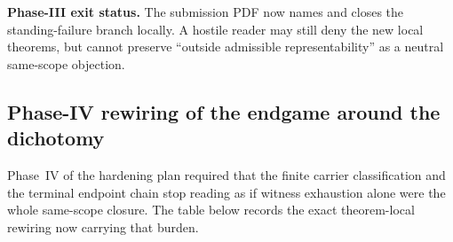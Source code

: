 \noindent\textbf{Phase-III exit status.} The submission PDF now names and closes the standing-failure branch locally. A hostile reader may still deny the new local theorems, but cannot preserve ``outside admissible representability'' as a neutral same-scope objection.

\subsection*{Phase-IV rewiring of the endgame around the dichotomy}
Phase~IV of the hardening plan required that the finite carrier classification and the terminal endpoint chain stop reading as if witness exhaustion alone were the whole same-scope closure. The table below records the exact theorem-local rewiring now carrying that burden.

